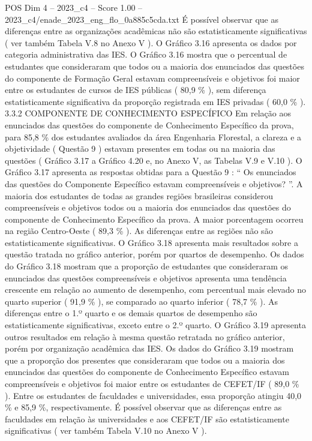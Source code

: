 \begin{textsample}{POS Dim 4 – 2023\_c4 – Score 1.00 – 2023\_c4/enade\_2023\_eng\_flo\_0a885c5cda.txt}
É possível observar que as diferenças entre as organizações acadêmicas não são estatisticamente significativas ( ver também Tabela V.8 no Anexo V ).
O Gráfico 3.16 apresenta os dados por categoria administrativa das IES.
O Gráfico 3.16 mostra que o percentual de estudantes que consideraram que todos ou a maioria dos enunciados das questões do componente de Formação Geral estavam compreensíveis e objetivos foi maior entre os estudantes de cursos de IES públicas ( 80,9 \% ), sem diferença estatisticamente significativa da proporção registrada em IES privadas ( 60,0 \% ). 3.3.2 COMPONENTE DE CONHECIMENTO ESPECÍFICO Em relação aos enunciados das questões do componente de Conhecimento Específico da prova, para 85,8 \% dos estudantes avaliados da área Engenharia Florestal, a clareza e a objetividade ( Questão 9 ) estavam presentes em todas ou na maioria das questões ( Gráfico 3.17 a Gráfico 4.20 e, no Anexo V, as Tabelas V.9 e V.10 ).
O Gráfico 3.17 apresenta as respostas obtidas para a Questão 9 : “ Os enunciados das questões do Componente Específico estavam compreensíveis e objetivos? ”.
A maioria dos estudantes de todas as grandes regiões brasileiras considerou compreensíveis e objetivos todos ou a maioria dos enunciados das questões do componente de Conhecimento Específico da prova.
A maior porcentagem ocorreu na região Centro-Oeste ( 89,3 \% ).
As diferenças entre as regiões não são estatisticamente significativas.
O Gráfico 3.18 apresenta mais resultados sobre a questão tratada no gráfico anterior, porém por quartos de desempenho.
Os dados do Gráfico 3.18 mostram que a proporção de estudantes que consideraram os enunciados das questões compreensíveis e objetivos apresenta uma tendência crescente em relação ao aumento de desempenho, com percentual mais elevado no quarto superior ( 91,9 \% ), se comparado ao quarto inferior ( 78,7 \% ).
As diferenças entre o 1.º quarto e os demais quartos de desempenho são estatisticamente significativas, exceto entre o 2.º quarto.
O Gráfico 3.19 apresenta outros resultados em relação à mesma questão retratada no gráfico anterior, porém por organização acadêmica das IES.
Os dados do Gráfico 3.19 mostram que a proporção dos presentes que consideraram que todos ou a maioria dos enunciados das questões do componente de Conhecimento Específico estavam compreensíveis e objetivos foi maior entre os estudantes de CEFET/IF ( 89,0 \% ).
Entre os estudantes de faculdades e universidades, essa proporção atingiu 40,0 \% e 85,9 \%, respectivamente.
É possível observar que as diferenças entre as faculdades em relação às universidades e aos CEFET/IF são estatisticamente significativas ( ver também Tabela V.10 no Anexo V ).

\end{textsample}
